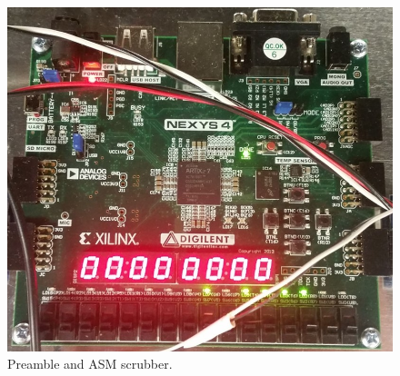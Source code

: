 \begin{figure}
	\centering\includegraphics[scale=0.5]{figures/eq_GPUimplementation/scrubber.jpg}
	\caption{Preamble and ASM scrubber.}
	\label{fig:scrubber}
\end{figure}
